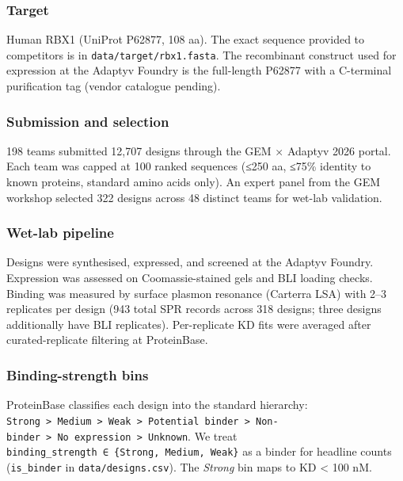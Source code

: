 \hypertarget{target}{%
\subsubsection{Target}\label{target}}

Human RBX1 (UniProt P62877, 108 aa). The exact sequence provided to
competitors is in \texttt{data/target/rbx1.fasta}. The recombinant
construct used for expression at the Adaptyv Foundry is the full-length
P62877 with a C-terminal purification tag (vendor catalogue pending).

\hypertarget{submission-and-selection}{%
\subsubsection{Submission and
selection}\label{submission-and-selection}}

198 teams submitted 12,707 designs through the GEM × Adaptyv 2026
portal. Each team was capped at 100 ranked sequences (≤250 aa, ≤75\%
identity to known proteins, standard amino acids only). An expert panel
from the GEM workshop selected 322 designs across 48 distinct teams for
wet-lab validation.

\hypertarget{wet-lab-pipeline}{%
\subsubsection{Wet-lab pipeline}\label{wet-lab-pipeline}}

Designs were synthesised, expressed, and screened at the Adaptyv
Foundry. Expression was assessed on Coomassie-stained gels and BLI
loading checks. Binding was measured by surface plasmon resonance
(Carterra LSA) with 2--3 replicates per design (943 total SPR records
across 318 designs; three designs additionally have BLI replicates).
Per-replicate KD fits were averaged after curated-replicate filtering
at ProteinBase.

\hypertarget{binding-strength-bins}{%
\subsubsection{Binding-strength bins}\label{binding-strength-bins}}

ProteinBase classifies each design into the standard hierarchy:
\texttt{Strong\ \textgreater{}\ Medium\ \textgreater{}\ Weak\ \textgreater{}\ Potential\ binder\ \textgreater{}\ Non-binder\ \textgreater{}\ No\ expression\ \textgreater{}\ Unknown}.
We treat \texttt{binding\_strength\ ∈\ \{Strong,\ Medium,\ Weak\}} as a
binder for headline counts (\texttt{is\_binder} in
\texttt{data/designs.csv}). The \emph{Strong} bin maps to KD
\textless{} 100 nM.

